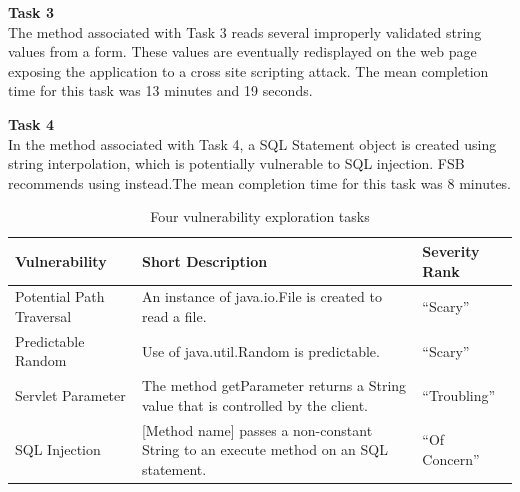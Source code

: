\documentclass{sig-alternate}
\begin{document}
\noindent\textbf{Task 3} \\
The method associated with Task 3 reads several improperly validated string values from a form. 
These values are eventually redisplayed on the web page exposing the application to a cross site scripting attack. 
The mean completion time for this task was 13 minutes and 19 seconds.

\noindent\textbf{Task 4} \\
In the method associated with Task 4, a SQL Statement object is created using string interpolation, which is potentially vulnerable to SQL injection. FSB recommends using   instead.The mean completion time for this task was 8 minutes.
\\

\begin{table} 
	\centering
	\caption{Four vulnerability exploration tasks}
	\begin{tabularx}{\textwidth}{|l|X|l|}
		\rowcolor{gray!50}
		\hline
		Vulnerability				& Short Description													& Severity Rank 	\\
		\hline	
		Potential Path Traversal	& An instance of java.io.File is created to read a file.     			& ``Scary''	    \\
		\hline
		Predictable Random			& Use of java.util.Random is predictable. 								& ``Scary''		\\
		\hline
		Servlet Parameter 			& The method getParameter returns a String value that is controlled by the client.			& ``Troubling''	\\
		\hline
		SQL Injection				& [Method name] passes a non-constant String to an execute method on an SQL statement.     	& ``Of Concern'' \\
		\hline
	\end{tabularx}
	\label{table:vulnerabilities}
\end{table}
\end{document}
